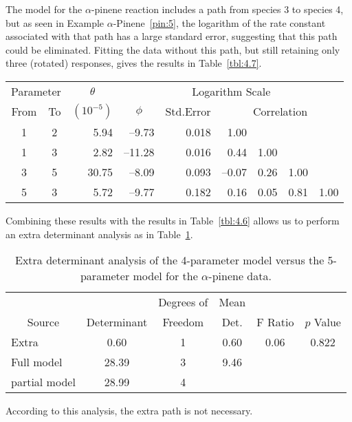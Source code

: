 \begin{example}\label{pin:6}
The model for the $\alpha$-pinene reaction includes a path from species
3 to species 4, but as seen in Example $\alpha$-Pinene~\ref{pin:5},
the logarithm of the rate constant associated with that path has a
large standard error, suggesting that this path could be eliminated.
Fitting the data without this path, but still retaining only three
(rotated) responses, gives the results in
Table~\ref{tbl:4.7}.
\begin{table}
  \begin{center}
    \begin{tabular}{ccrrrrrrr}\hline
      \multicolumn{2}{c}{Parameter} & \multicolumn{1}{c}{$\theta$} &
      \multicolumn{6}{c}{Logarithm Scale}\\
      \multicolumn{1}{c}{From} &\multicolumn{1}{c}{To} &
      \multicolumn{1}{c}{$( 10^{-5} )$}  & \multicolumn{1}{c}{$\phi$}
      & \multicolumn{1}{c}{Std.Error} & \multicolumn{4}{c}{Correlation}\\ \hline
      1&2&5.94&--9.73&0.018&1.00\\
      1&3&2.82&--11.28&0.016&0.44&1.00\\
      3&5&30.75&--8.09&0.093&--\/0.07&0.26&1.00\\
      5&3&5.72&--9.77&0.182&0.16&0.05&0.81&1.00\\ \hline
    \end{tabular}
  \end{center}
\end{table}
Combining these results with the results in Table~\ref{tbl:4.6}
allows us to perform an extra determinant analysis as in
Table~\ref{tbl:4.8a}.
\begin{table}
  \caption{\label{tbl:4.8a}
  Extra determinant analysis of the 4-parameter model versus
  the 5-parameter model for the $\alpha$-pinene data.}
  \begin{center}
    \begin{tabular}{lccccc}\hline
      && \multicolumn{1}{c}{Degrees of} & \multicolumn{1}{c}{Mean}\\
      \multicolumn{1}{c}{Source} & \multicolumn{1}{c}{Determinant} &
      \multicolumn{1}{c}{Freedom} & \multicolumn{1}{c}{Det.} &
      \multicolumn{1}{c}{F Ratio} & \multicolumn{1}{c}{$p$ Value}\\ \hline
      Extra&0.60&1&0.60&0.06&0.822\\
      Full model&28.39&3&9.46\\ \hline
      partial model&28.99&4\\ \hline
    \end{tabular}
  \end{center}
\end{table}
According to this analysis, the extra path is not necessary.


\end{example}

